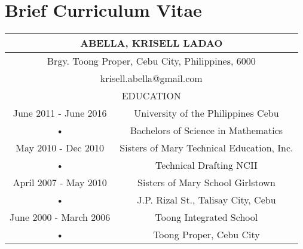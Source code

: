 \chapter*{Brief Curriculum Vitae}

\begin{tabular}{|c|c|}
\hline 
\multicolumn{2}{|c|}{ABELLA, KRISELL LADAO} \\ 
\hline 
\multicolumn{2}{|c|}{Brgy. Toong Proper, Cebu City, Philippines, 6000} \\ 
\hline 
\multicolumn{2}{|c|}{krisell.abella@gmail.com} \\ 
\hline 
\multicolumn{2}{|c|}{EDUCATION} \\ 
\hline 
June 2011 - June 2016 & University of the Philippines Cebu \\ 
\hline 
• & Bachelors of Science in Mathematics \\ 
\hline 
May 2010 - Dec 2010 & Sisters of Mary Technical Education, Inc. \\ 
\hline 
• & Technical Drafting NCII \\ 
\hline 
April 2007 - May 2010 & Sisters of Mary School Girlstown \\ 
\hline 
• & J.P. Rizal St., Talisay City, Cebu \\ 
\hline 
June 2000 - March 2006 & Toong Integrated School \\ 
\hline 
• & Toong Proper, Cebu City \\ 
\hline 
\end{tabular} 